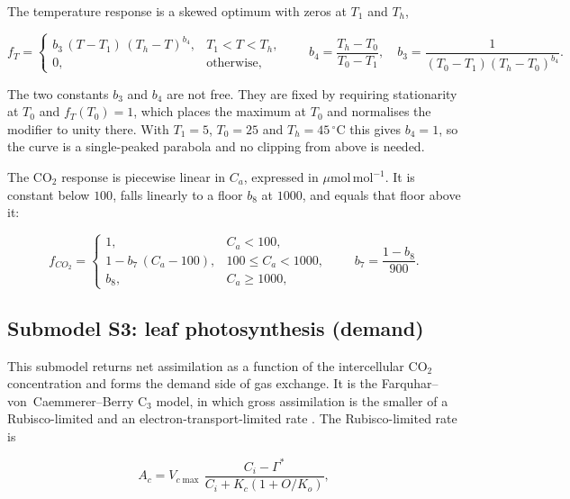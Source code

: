 The temperature response is a skewed optimum with zeros at $T_1$ and $T_h$,

\begin{equation}
f_T =
\begin{cases}
b_3\,(T - T_1)\,(T_h - T)^{b_4}, & T_1 < T < T_h, \\[4pt]
0, & \text{otherwise},
\end{cases}
\qquad
b_4 = \frac{T_h - T_0}{T_0 - T_1},
\quad
b_3 = \frac{1}{(T_0 - T_1)(T_h - T_0)^{b_4}} .
\label{eq:jarvis_T}
\end{equation}

The two constants $b_3$ and $b_4$ are not free. They are fixed by requiring
stationarity at $T_0$ and $f_T(T_0)=1$, which places the maximum at $T_0$ and
normalises the modifier to unity there. With $T_1 = 5$, $T_0 = 25$ and
$T_h = 45\,^\circ$C this gives $b_4 = 1$, so the curve is a single-peaked
parabola and no clipping from above is needed.

The CO$_2$ response is piecewise linear in $C_a$, expressed in
$\mu\mathrm{mol\,mol^{-1}}$. It is constant below $100$, falls linearly to a floor
$b_8$ at $1000$, and equals that floor above it:

\begin{equation}
f_{\mathit{CO_2}} =
\begin{cases}
1, & C_a < 100, \\[4pt]
1 - b_7\,(C_a - 100), & 100 \leq C_a < 1000, \\[4pt]
b_8, & C_a \geq 1000,
\end{cases}
\qquad
b_7 = \frac{1 - b_8}{900} .
\label{eq:jarvis_co2}
\end{equation}

\subsection{Submodel S3: leaf photosynthesis (demand)}
\label{sec:farquhar}

This submodel returns net assimilation as a function of the intercellular
CO$_2$ concentration and forms the demand side of gas exchange. It is the
Farquhar--von~Caemmerer--Berry C$_3$ model, in which gross assimilation is the
smaller of a Rubisco-limited and an electron-transport-limited rate
\citep{Farquhar1980,vonCaemmerer2000}. The Rubisco-limited rate is

\begin{equation}
A_c = V_{c\max}\,
\frac{C_i - \Gamma^{*}}{C_i + K_c\!\left(1 + O/K_o\right)},
\label{eq:Ac}
\end{equation}

